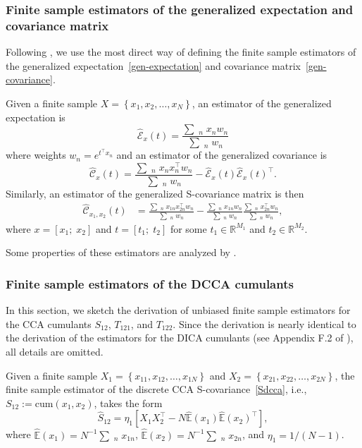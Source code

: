 \documentclass{article}
\newcommand{\sbra}[1]{\left[#1\right]}
\newcommand{\cbra}[1]{\left\{#1\right\}}
\newcommand{\wh}[1]{\widehat{#1}}
\newcommand{\R}{\mathbb{R}}
\newcommand{\ebb}{\mathbb{E}}
\newcommand{\webb}{\wh{\ebb}}
\newcommand{\cum}{\mathrm{cum}}
\newcommand{\sumn}{\sum\mathop{}_{n}}
\newcommand{\ccal}{\mathcal{C}}
\newcommand{\ecal}{\mathcal{E}}
\begin{document}
\subsubsection{Finite sample estimators of the generalized expectation and covariance matrix}
\label{app:finite-sample-generalized-covariances}

Following \citet{Yer2000,SlaYer2012b}, we use the most direct way of defining the finite sample estimators of the generalized expectation~\eqref{gen-expectation}  and covariance matrix~\eqref{gen-covariance}.

Given a finite sample $X=\cbra{x_1,x_2, \dots,x_N}$, an estimator of the generalized expectation is
$$
\wh{\ecal}_x (t) = \frac{ \sumn x_n w_n }{\sumn w_n }
$$
where weights $w_n = e^{t^{\top} x_n}$
and an estimator of the generalized covariance is
$$
\wh{\ccal}_x (t) = \frac{ \sumn x_n x_n^{\top} w_n }{\sumn w_n } - \wh{\ecal}_x(t) \wh{\ecal}_x(t)^{\top}.
$$
Similarly, an estimator of the generalized S-covariance matrix is then
$$
\begin{aligned}
\wh{\ccal}_{x_1,x_2} (t) &= \frac{ \sumn x_{1n} x_{2n}^{\top} w_n }{\sumn w_n }
 - \frac{ \sumn x_{1n} w_n }{ \sumn w_n } \frac{ \sumn x_{2n}^{\top} w_n }{ \sumn w_n },
\end{aligned}
$$
where $x=[x_1;\;x_2]$ and $t=[t_1;\;t_2]$ for some $t_1\in\R^{M_1}$ and $t_2\in\R^{M_2}$.

Some properties of these estimators are analyzed by \citet{SlaYer2012b}.

\subsubsection{Finite sample estimators of the DCCA cumulants}
\label{app:finite-sample-cumulants}
In this section, we sketch the derivation of unbiased finite sample estimators for the CCA cumulants $S_{12}$, $T_{121}$, and $T_{122}$. Since the derivation is nearly identical to the derivation of the estimators for the DICA cumulants (see Appendix F.2 of \citet{PodEtAl2015}), all details are omitted.


Given a finite sample $X_1=\cbra{ x_{11}, x_{12},\dots,x_{1N} }$ and $X_2=\cbra{x_{21}, x_{22},\dots,x_{2N}}$, the finite sample estimator of the discrete CCA S-covariance~\eqref{Sdcca}, i.e., $S_{12} := \cum(x_1,x_2)$, takes the form 
\begin{equation}
\label{temp:sample-estimator-s12}
\wh{S}_{12}  = \eta_1 \sbra{ X_1X_2^{\top} - N \webb(x_1) \webb(x_2)^{\top} },
\end{equation}
where $\webb(x_1)=N^{-1}\sumn x_{1n}$, $\webb(x_2) = N^{-1}\sumn x_{2n}$, and $\eta_1 = 1/(N-1)$.
\end{document}
